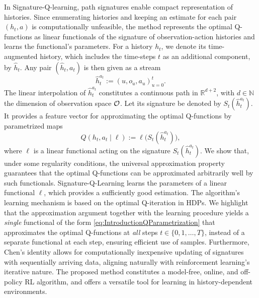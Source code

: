 \documentclass[
    a4paper,
    11pt,
    bibliography=totoc,
    listof=totoc,      
    headinclude=true,
    cleardoublepage=empty,
]{scrbook}
\theoremstyle{plain}
\theoremstyle{definition}
\theoremstyle{remark}
\newcommand{\SetR}{\mathbb R}
\newcommand{\SetN}{\mathbb N}
\newcommand{\SpaceO}{{\cal O}}
\begin{document}

In Signature-Q-learning, path signatures enable compact representation of 
histories. Since enumerating histories and keeping an estimate for each pair 
$(h_t,a)$ is computationally unfeasible, the method represents the optimal 
Q-functions as linear functionals of the signature of observation-action 
histories and learns the functional's parameters. For a history $h_t$, we 
denote its time-augmented history, which includes the time-steps $t$ as an 
additional component, by $\hat{h}_t$. Any pair $(\hat{h}_t,a_t)$ is then given 
as a stream
\[
    \hat{h}_t^{a_t} := (u, o_u, a_u)_{u=0}^t.
\]
The linear interpolation of $\hat{h}_t^{a_t}$ constitutes a continuous path in 
$\SetR^{d+2}$, with $d\in\SetN$ the dimension of observation space $\SpaceO$. 
Let its signature be denoted by $S_t(\hat{h}_t^{a_t})$. It provides a feature 
vector for approximating the optimal Q-functions by parametrized maps
\begin{equation}
\label{eq:IntroductionQParametrization}    
    Q(h_t,a_t\mid\ell) 
    := \ell\bigl(S_t(\hat{h}_t^{a_t}) \bigr),
\end{equation}
where $\ell$ is a linear functional acting on the 
signature $S_t(\hat{h}_t^{a_t})$. We show that, under some regularity conditions, the universal approximation property guarantees that the optimal Q-functions can be approximated arbitrarily well by such functionals. Signature-Q-Learning learns the parameters of a linear functional $\ell$, which provides a sufficiently good estimation. The algorithm's learning mechanism is based on the optimal Q-iteration in HDPs. We highlight that the approximation argument together with the learning procedure yields a \textit{single} functional of 
the form \eqref{eq:IntroductionQParametrization} that approximates the optimal 
Q-functions at \textit{all} steps $t\in\{0,1,\dots,T\}$, instead of a separate 
functional at each step, ensuring efficient use of samples. Furthermore, Chen's 
identity allows for computationally inexpensive updating of signatures with 
sequentially arriving data, aligning naturally with reinforcement learning's 
iterative nature. The proposed method constitutes a model-free, online, and 
off-policy RL algorithm, and offers a versatile tool for learning in 
history-dependent environments.

\end{document}
